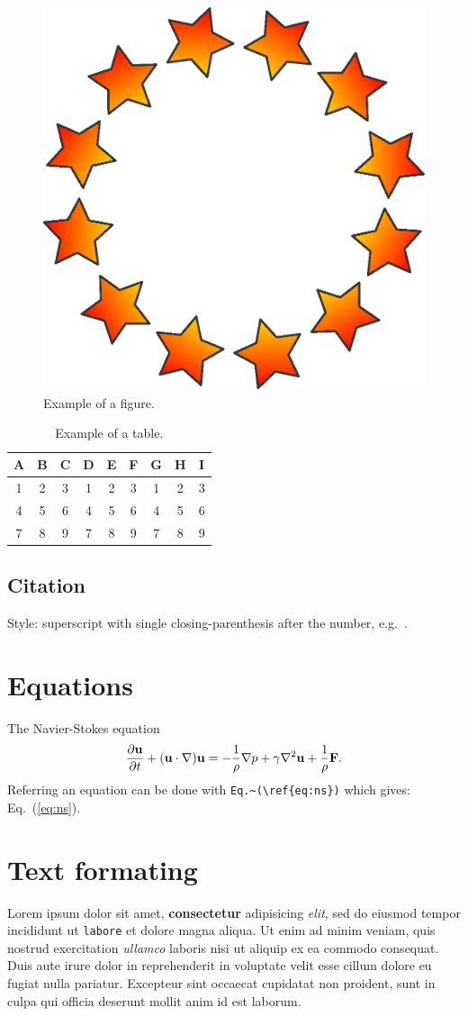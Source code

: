 \documentclass[jp]{nctam_proceeding}
\begin{document}
\begin{figure}[!ht]
\centering
\includegraphics[width=0.5\linewidth]{samplefig.eps}
\caption{Example of a figure.}
\label{fig:ex}
\end{figure}


\begin{table}[!ht]
\caption{Example of a table.}
\label{table:ex}
\centering
\begin{tabular}{ ccccccccc }
   \hline
   A & B & C & D & E & F & G & H & I\\
   \hline
   1 & 2 & 3 & 1 & 2 & 3 & 1 & 2 & 3  \\
   4 & 5 & 6 & 4 & 5 & 6 & 4 & 5 & 6  \\
   7 & 8 & 9 & 7 & 8 & 9 & 7 & 8 & 9  \\
   \hline
\end{tabular}
\end{table}

\subsection{Citation}
Style: superscript with single closing-parenthesis after the number,
e.g.\ \cite{greenwade93}.

\section{Equations}
The Navier-Stokes equation
\begin{equation}
{\partial{\bf u}\over{\partial t}} + ({\bf u} \cdot \nabla) {\bf u} = - {1\over\rho} \nabla p + \gamma\nabla^2{\bf u} + {1\over\rho}{\bf F}.\label{eq:ns}
\end{equation}
Referring an equation can be done with \verb|Eq.~(\ref{eq:ns})| which gives:
Eq.~(\ref{eq:ns}).

\section{Text formating}
Lorem ipsum dolor sit amet, \textbf{consectetur} adipisicing \emph{elit}, sed do eiusmod
tempor incididunt ut \texttt{labore} et dolore magna aliqua. Ut enim ad minim veniam,
quis nostrud exercitation \textit{ullamco} laboris nisi ut aliquip ex ea commodo
consequat. Duis aute irure dolor in reprehenderit in voluptate velit esse
cillum dolore eu fugiat nulla pariatur. Excepteur sint occaecat cupidatat non
proident, sunt in culpa qui officia deserunt mollit anim id est laborum.
\end{document}
